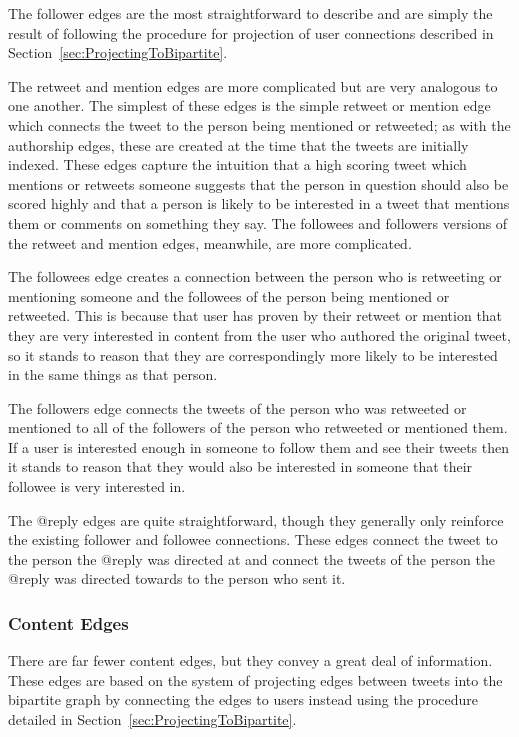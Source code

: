 The follower edges are the most straightforward to describe and are simply the result of following the procedure for projection of user connections described in Section~\ref{sec:ProjectingToBipartite}.

The retweet and mention edges are more complicated but are very analogous to one another. The simplest of these edges is the simple retweet or mention edge which connects the tweet to the person being mentioned or retweeted; as with the authorship edges, these are created at the time that the tweets are initially indexed. These edges capture the intuition that a high scoring tweet which mentions or retweets someone suggests that the person in question should also be scored highly and that a person is likely to be interested in a tweet that mentions them or comments on something they say. The followees and followers versions of the retweet and mention edges, meanwhile, are more complicated.

The followees edge creates a connection between the person who is retweeting or mentioning someone and the followees of the person being mentioned or retweeted. This is because that user has proven by their retweet or mention that they are very interested in content from the user who authored the original tweet, so it stands to reason that they are correspondingly more likely to be interested in the same things as that person.

The followers edge connects the tweets of the person who was retweeted or mentioned to all of the followers of the person who retweeted or mentioned them. If a user is interested enough in someone to follow them and see their tweets then it stands to reason that they would also be interested in someone that their followee is very interested in.

The @reply edges are quite straightforward, though they generally only reinforce the existing follower and followee connections. These edges connect the tweet to the person the @reply was directed at and connect the tweets of the person the @reply was directed towards to the person who sent it.


\subsubsection{Content Edges}

There are far fewer content edges, but they convey a great deal of information. These edges are based on the system of projecting edges between tweets into the bipartite graph by connecting the edges to users instead using the procedure detailed in Section~\ref{sec:ProjectingToBipartite}.

